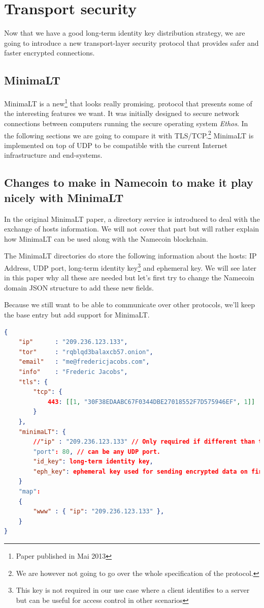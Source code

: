 \documentclass{vldb}
\begin{document}
\newpage
\section{Transport security}

Now that we have a good long-term identity key distribution strategy, we are going to introduce a new transport-layer security protocol that provides safer and faster encrypted connections.
\subsection{MinimaLT}
MinimaLT\cite{MinimaLT} is a new\footnote{Paper published in Mai 2013} that looks really promising.
protocol that presents some of the interesting features we want. It was initially designed to secure network connections between computers running the secure operating system \emph{Ethos}. In the following sections we are going to compare it with TLS/TCP.\footnote{We are however not going to go over the whole specification of the protocol.} 
MinimaLT is implemented on top of UDP to be compatible with the current Internet infrastructure and end-systems.

\subsection{Changes to make in Namecoin to make it play nicely with MinimaLT}

In the original MinimaLT paper, a directory service is introduced to deal with the exchange of hosts information. We will not cover that part but will rather explain how MinimaLT can be used along with the Namecoin blockchain.

The MinimaLT directories do store the following information about the hosts: IP Address, UDP port, long-term identity key\footnote{This key is not required in our use case where a client identifies to a server but can be useful for access control in other scenarios} and ephemeral key. We will see later in this paper why all these are needed but let's first try to change the Namecoin domain JSON structure to add these new fields. 

Because we still want to be able to communicate over other protocols, we'll keep the base entry but add support for MinimaLT. 

\begin{lstlisting}[language=json,firstnumber=1]
{
    "ip"      : "209.236.123.133",
    "tor"     : "rqblqd3balaxcb57.onion",
    "email"   : "me@fredericjacobs.com",
    "info"    : "Frederic Jacobs",
    "tls": {
        "tcp": {
            443: [[1, "30F38EDAABC67F0344DBE27018552F7D575946EF", 1]]
        }
    },
    "minimaLT": {
        //"ip" : "209.236.123.133" // Only required if different than the default one
        "port": 80, // can be any UDP port.
        "id_key": long-term identity key,
        "eph_key": ephemeral key used for sending encrypted data on first RTT.
    }
    "map":
    {
        "www" : { "ip": "209.236.123.133" },
    }
}
\end{lstlisting}
\end{document}

